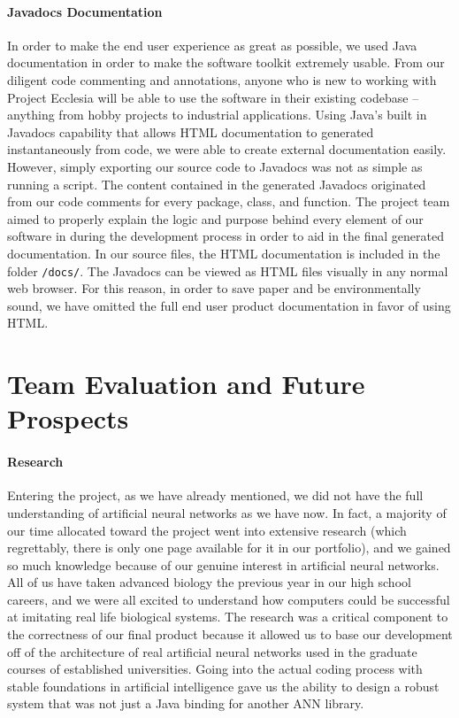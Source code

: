 \documentclass[letterpaper, 10pt]{article}
\begin{document}
		\paragraph{Javadocs Documentation}
		In order to make the end user experience as great as possible, we used Java documentation in order to make the software toolkit extremely usable. From our diligent code commenting and annotations, anyone who is new to working with Project Ecclesia will be able to use the software in their existing codebase -- anything from hobby projects to industrial applications. Using Java's built in Javadocs capability that allows HTML documentation to generated instantaneously from code, we were able to create external documentation easily. However, simply exporting our source code to Javadocs was not as simple as running a script. The content contained in the generated Javadocs originated from our code comments for every package, class, and function. The project team aimed to properly explain the logic and purpose behind every element of our software in during the development process in order to aid in the final generated documentation. In our source files, the HTML documentation is included in the folder \texttt{/docs/}. The Javadocs can be viewed as HTML files visually in any normal web browser. For this reason, in order to save paper and be environmentally sound, we have omitted the full end user product documentation in favor of using HTML.
		
\cleardoublepage		
\section{Team Evaluation and Future Prospects}
	\paragraph{Research}
	Entering the project, as we have already mentioned, we did not have the full understanding of artificial neural networks as we have now. In fact, a majority of our time allocated toward the project went into extensive research (which regrettably, there is only one page available for it in our portfolio), and we gained so much knowledge because of our genuine interest in artificial neural networks. All of us have taken advanced biology the previous year in our high school careers, and we were all excited to understand how computers could be successful at imitating real life biological systems. The research was a critical component to the correctness of our final product because it allowed us to base our development off of the architecture of real artificial neural networks used in the graduate courses of established universities. Going into the actual coding process with stable foundations in artificial intelligence gave us the ability to design a robust system that was not just a Java binding for another ANN library.
\end{document}
